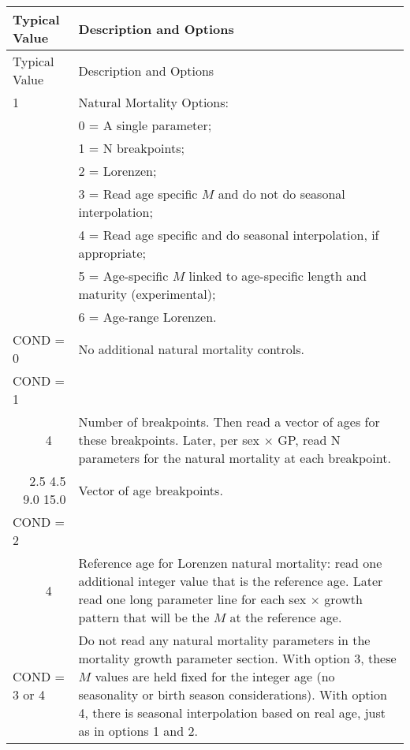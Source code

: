 \begin{longtable}{p{0.5cm} p{2cm} p{12.75cm}}
	\hline	
	\multicolumn{2}{l}{Typical Value} & Description and Options \Tstrut\Bstrut\\
	\hline
	\endfirsthead

	\hline
	\multicolumn{2}{l}{Typical Value} & Description and Options \Tstrut\Bstrut\\
	\hline
	\endhead
	\hline

	\endfoot
	
	\endlastfoot

	1 & & Natural Mortality Options: \Tstrut\\
	  & & 0 = A single parameter; \\
	  & & 1 = N breakpoints; \\
	  & & 2 = Lorenzen; \\
	  & & 3 = Read age specific $M$ and do not do seasonal interpolation; \\
	  & & 4 = Read age specific and do seasonal interpolation, if appropriate; \\
	  & & 5 = Age-specific $M$ linked to age-specific length and maturity (experimental); \\
	  & & 6 = Age-range Lorenzen. \Bstrut\\
	\hline

	\multicolumn{2}{l}{COND = 0} & No additional natural mortality controls. \Tstrut\Bstrut\\
	\hline

	\multicolumn{2}{l}{COND = 1} & \Tstrut\Bstrut\\
	& 4 & Number of breakpoints. Then read a vector of ages for these breakpoints. Later, per sex $\times$ GP, read N parameters for the natural mortality at each breakpoint. \\

	\multicolumn{2}{r}{2.5 4.5 9.0 15.0} & Vector of age breakpoints. \Bstrut\\
	\hline
	
	\multicolumn{2}{l}{COND = 2} & \Tstrut\\
	& 4 \Tstrut & Reference age for Lorenzen natural mortality: read one additional integer value that is the reference age. Later read one long parameter line for each sex $\times$ growth pattern that will be the $M$ at the reference age. \\
	\hline
	
	\multicolumn{2}{l}{COND = 3 or 4} \Tstrut & Do not read any natural mortality parameters in the mortality growth parameter section. With option 3, these $M$ values are held fixed for the integer age (no seasonality or birth season considerations). With option 4, there is seasonal interpolation based on real age, just as in options 1 and 2.\\


\end{longtable}
